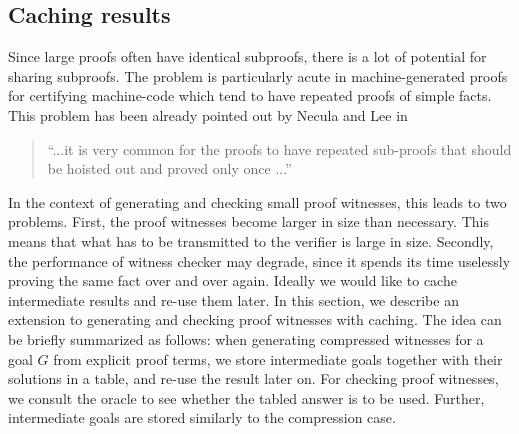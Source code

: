 \documentclass{llncs}
\begin{document}


\subsection{Caching results}
\label{sec:tabling}
Since large proofs often have identical subproofs,  there is a
lot of potential for sharing subproofs. The problem is particularly
acute in machine-generated proofs for certifying machine-code which
tend to have repeated proofs of simple facts. This problem has been
already pointed out by Necula and Lee in \cite{NeculaLee+97:resource}

\begin{quote}
``...it is very common for the proofs to have  
repeated sub-proofs that should be hoisted out and 
proved only once ...'' \cite{NeculaLee+97:resource}
 \end{quote}


In the context of generating and checking small proof witnesses, this
leads to two problems.  First, the proof witnesses become larger in
size than necessary. This means that what has to be transmitted to the
verifier is large in size. Secondly, the performance of witness
checker may degrade, since it spends its time uselessly proving the
same fact over and over again. Ideally we would like to cache
intermediate results and re-use them later. In this section, we
describe an extension to generating and checking proof witnesses with
caching. The idea can be briefly summarized as follows: when
generating compressed witnesses for a goal $G$ from explicit proof
terms, we store intermediate goals together with their solutions in a
table, and re-use the result later on. For checking proof witnesses,
we consult the oracle to see whether the tabled answer is to be
used. Further, intermediate goals are stored similarly to the
compression case.
\end{document}
